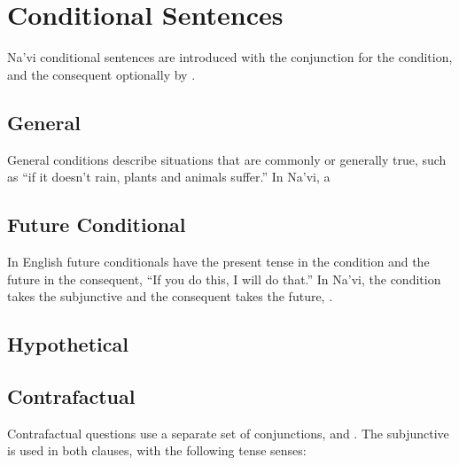 \section{Conditional Sentences}
\noindent Na'vi conditional sentences are introduced with the
conjunction   for the condition, and the consequent
optionally by  .
\label{syn:conditionals}

\subsection{General} General conditions describe situations that are
commonly or generally true, such as ``if it doesn't rain, plants and
animals suffer.''  In Na'vi, a   

\subsection{Future Conditional} In English future conditionals have
the present tense in the con\-dition and the future in the consequent,
``If you do this, I will do that.''  In Na'vi, the condition takes the
subjunctive and the consequent takes the future,  . 

\subsection{Hypothetical} 

\subsection{Contrafactual} Contrafactual questions use a separate set
of conjunctions,   and  .  The subjunctive
is used in both clauses, with the following tense senses:

